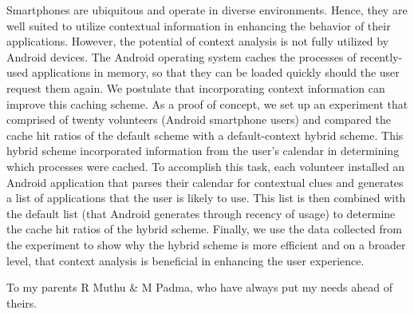 \documentclass[12pt]{uthesis-v12}  %
\begin{document}

\begin{abstractpage}
	Smartphones are ubiquitous and operate in diverse environments. Hence, they are well suited to utilize contextual information in enhancing the behavior of their applications. However, the potential of context analysis is not fully utilized by Android devices. The Android operating system caches the processes of recently-used applications in memory, so that they can be loaded quickly should the user request them again. We postulate that incorporating context information can improve this caching scheme. As a proof of concept, we set up an experiment that comprised of twenty volunteers (Android smartphone users) and compared the cache hit ratios of the default scheme with a default-context hybrid scheme. This hybrid scheme incorporated information from the user's calendar in determining which processes were cached.  To accomplish this task, each volunteer installed an Android application that parses their calendar for contextual clues and generates a list of applications that the user is likely to use. This list is then combined with the default list (that Android generates through recency of usage) to determine the cache hit ratios of the hybrid scheme. Finally, we use the data collected from the experiment to show why the hybrid scheme is more efficient and on a broader level, that context analysis is beneficial in enhancing the user experience.        
\end{abstractpage}


\begin{dedication}
\noindent To my parents R Muthu \& M Padma, who have always put my needs ahead of theirs.
\end{dedication}
\end{document}
